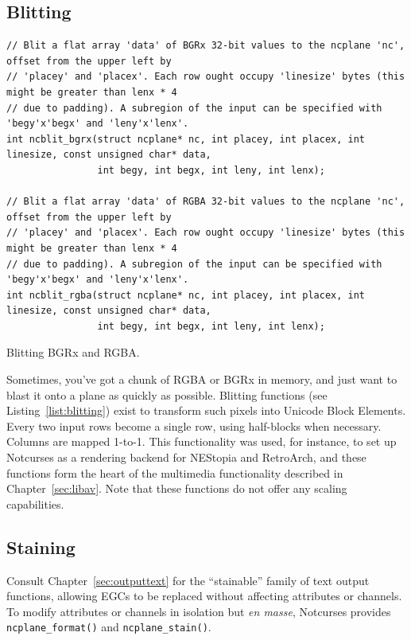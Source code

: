 \documentclass[letterpaper,10pt]{article}
\begin{document}
\subsection{Blitting}
\label{sec:blitting}
\begin{listing}[!htb]
\begin{verbatim}
// Blit a flat array 'data' of BGRx 32-bit values to the ncplane 'nc', offset from the upper left by
// 'placey' and 'placex'. Each row ought occupy 'linesize' bytes (this might be greater than lenx * 4
// due to padding). A subregion of the input can be specified with 'begy'x'begx' and 'leny'x'lenx'.
int ncblit_bgrx(struct ncplane* nc, int placey, int placex, int linesize, const unsigned char* data,
                int begy, int begx, int leny, int lenx);

// Blit a flat array 'data' of RGBA 32-bit values to the ncplane 'nc', offset from the upper left by
// 'placey' and 'placex'. Each row ought occupy 'linesize' bytes (this might be greater than lenx * 4
// due to padding). A subregion of the input can be specified with 'begy'x'begx' and 'leny'x'lenx'.
int ncblit_rgba(struct ncplane* nc, int placey, int placex, int linesize, const unsigned char* data,
                int begy, int begx, int leny, int lenx);
\end{verbatim}
\caption{Blitting BGRx and RGBA.}
\label{list:blitting}
\end{listing}

Sometimes, you've got a chunk of RGBA or BGRx in memory, and just want to blast
it onto a plane as quickly as possible. Blitting functions (see Listing~\ref{list:blitting})
exist to transform such pixels into Unicode Block Elements. Every two input rows
become a single row, using half-blocks when necessary. Columns are mapped 1-to-1.
This functionality was used, for instance, to set up Notcurses as a rendering
backend for NEStopia and RetroArch, and these functions form the heart of the
multimedia functionality described in Chapter~\ref{sec:libav}. Note that these
functions do not offer any scaling capabilities.

\subsection{Staining}
\label{sec:staining}
Consult Chapter~\ref{sec:outputtext} for the ``stainable'' family of text output
functions, allowing EGCs to be replaced without affecting attributes or channels.
To modify attributes or channels in isolation but \textit{en masse}, Notcurses
provides \texttt{ncplane\_format()} and \texttt{ncplane\_stain()}.
\end{document}
